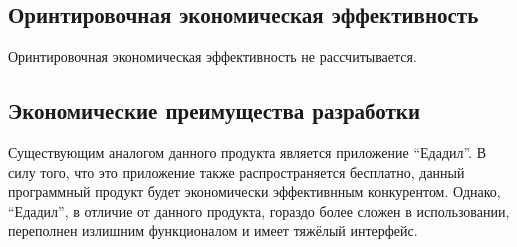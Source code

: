 \subsection{Оринтировочная экономическая эффективность}
Оринтировочная экономическая эффективность не рассчитывается.

\subsection{Экономические преимущества разработки}
Существующим аналогом данного продукта является приложение ``Едадил''. В силу
того, что это приложение также распространяется бесплатно, данный программный
продукт будет экономически эффективнным конкурентом. Однако, ``Едадил'', в
отличие от данного продукта, гораздо более сложен в использовании, переполнен
излишним функционалом и имеет тяжёлый интерфейс.
